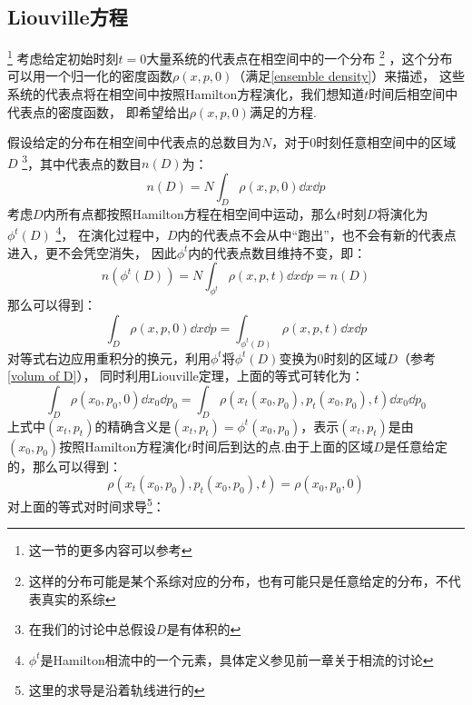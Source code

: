     \subsection{Liouville方程}
    \footnote{这一节的更多内容可以参考\cite{Tuckerman2010Statistical2}}
    考虑给定初始时刻$t=0$大量系统的代表点在相空间中的一个分布
    \footnote{这样的分布可能是某个系综对应的分布，也有可能只是任意给定的分布，不代表真实的系综}
    ，这个分布可以用一个归一化的密度函数$\rho(x, p, 0)$（满足\ref{ensemble density}）来描述，
    这些系统的代表点将在相空间中按照Hamilton方程演化，我们想知道$t$时间后相空间中代表点的密度函数，
    即希望给出$\rho(x, p, 0)$满足的方程.
    \par
    假设给定的分布在相空间中代表点的总数目为$N$，对于0时刻任意相空间中的区域$D$
    \footnote{在我们的讨论中总假设$D$是有体积的}，其中代表点的数目$n(D)$为：
    \begin{equation}
        n(D) = N\int_{D}\rho(x, p, 0)\dd x\dd p
    \end{equation}
    考虑$D$内所有点都按照Hamilton方程在相空间中运动，那么$t$时刻$D$将演化为$\phi^t(D)$
    \footnote{$\phi^t$是Hamilton相流中的一个元素，具体定义参见前一章关于相流的讨论}，
    在演化过程中，$D$内的代表点不会从中“跑出”，也不会有新的代表点进入，更不会凭空消失，
    因此$\phi^t$内的代表点数目维持不变，即：
    \begin{equation}
        n(\phi^t(D)) = N\int_{\phi^t}\rho(x, p, t)\dd x\dd p = n(D)
    \end{equation}
    那么可以得到：
    \begin{equation}
        \int_{D}\rho(x, p, 0)\dd x\dd p = \int_{\phi^t(D)}\rho(x, p, t)\dd x\dd p
    \end{equation}
    对等式右边应用重积分的换元，利用$\phi^t$将$\phi^t(D)$变换为0时刻的区域$D$（参考\ref{volum of D}），
    同时利用Liouville定理，上面的等式可转化为：
    \begin{equation}
        \int_{D}\rho(x_0, p_0, 0)\dd x_0\dd p_0 = \int_{D}\rho(x_t(x_0, p_0), p_t(x_0, p_0), t)\dd x_0 \dd p_0
    \end{equation}
    上式中$(x_t, p_t)$的精确含义是$(x_t, p_t) = \phi^t(x_0, p_0)$，表示$(x_t, p_t)$是由
    $(x_0, p_0)$按照Hamilton方程演化$t$时间后到达的点.由于上面的区域$D$是任意给定的，那么可以得到：
    \begin{equation}
        \rho(x_t(x_0, p_0), p_t(x_0, p_0), t) = \rho(x_0, p_0, 0)
        \label{Liouville equation Lagrange}
    \end{equation}
    对上面的等式对时间求导\footnote{这里的求导是沿着轨线进行的}：
